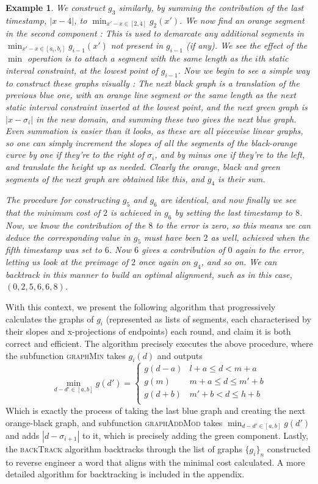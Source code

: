 \documentclass[conference]{IEEEtran}
\newcounter{cases}
\newtheorem{example}{Example}
\begin{document}
\begin{example}
		We construct $g_3$ similarly, by summing the contribution of the last timestamp, $|x - 4|$, to  $\min_{x' - x \in [2,4]}g_2(x')$. 
		We now find an orange segment in the second component :  This is used to demarcate any additional segments in  $\min_{x' - x \in [a_i, b_i]}g_{i-1}(x')$ not present in $g_{i-1}$ (if any). 
		We see the effect of the $\min$ operation is to attach a segment with the same length as the $i$th static interval constraint, at the lowest point of $g_{i-1}$. 
		Now we begin to see a simple way to construct these graphs visually : The next black graph is a translation of the previous blue one, with an orange line segment or the same length as the next static interval constraint inserted at the lowest point, and the next green graph is $|x-\sigma_i|$ in the new domain, and summing these two gives the next blue graph. 
		Even summation is easier than it looks, as these are all piecewise linear graphs, so one can simply increment the slopes of all the segments of the black-orange curve by one if they're to the right of $\sigma_i$, and by minus one if they're to the left, and translate the height up as needed. 
		Clearly the orange, black and green segments of the next graph are obtained like this, and $g_4$ is their sum. 
		
		The procedure for constructing $g_5$ and $g_6$ are identical, and now finally we see that the minimum cost of $2$ is achieved in $g_6$ by setting the last timestamp to $8$. 
		Now, we know the contribution of the $8$ to the error is zero, so this means we can deduce the corresponding value in $g_5$ must have been $2$ as well, achieved when the fifth timestamp was set to $6$. 
		Now $6$ gives a contribution of $0$ again to the error, letting us look at the preimage of $2$ once again on $g_4$, and so on. 
		We can backtrack in this manner to build an optimal alignment, such as in this case, $(0,2,5,6,6,8)$. 
	\end{example}
	
	
	
	With this context, we present the following algorithm that progressively calculates the graphs of $g_i$ (represented as lists of segments, each characterised by their slopes and x-projections of endpoints) each round, and claim it is both correct and efficient. 
	The algorithm precisely executes the above procedure, where the subfunction \textsc{graphMin} takes $g_i(d)$ and outputs $$\min_{d-d' \in [a,b]} g(d') = \begin{cases}
		g(d-a) & l + a \leq d < m + a \\
		g(m) & m+a \leq d \leq m' + b \\
		g(d+b) & m' + b < d \leq h + b   \\
	\end{cases}$$ Which is exactly the process of taking the last blue graph and creating the next orange-black graph, and subfunction \textsc{graphAddMod} takes $\min_{d-d' \in [a,b]} g(d')$ and adds $|d - \sigma_{i+1}|$ to it, which is precisely adding the green component.  Lastly, the \textsc{backTrack} algorithm backtracks through the list of graphs $\{g_i\}_n$ constructed to reverse engineer a word that aligns with the minimal cost calculated. A more detailed algorithm for backtracking is included in the appendix. 
	
\end{document}
